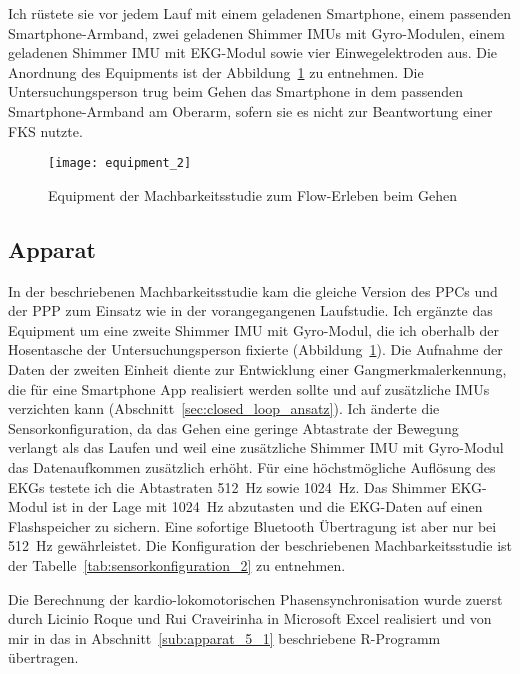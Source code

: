 Ich rüstete sie vor jedem Lauf mit einem geladenen Smartphone, einem passenden Smartphone-Armband, zwei geladenen Shimmer \acp{IMU} mit Gyro-Modulen, einem geladenen Shimmer \ac{IMU} mit \ac{EKG}-Modul sowie vier Einwegelektroden aus. Die Anordnung des Equipments ist der Abbildung~\ref{fig:equipment_2} zu entnehmen. Die Untersuchungsperson trug beim Gehen das Smartphone in dem passenden Smartphone-Armband am Oberarm, sofern sie es nicht zur Beantwortung einer \ac{FKS} nutzte. 
\begin{figure}
	[!htb] \centering 
	\texttt{[image: equipment\_2]} \caption[Equipment (Machbarkeitsstudie: Gehen)]{Equipment der Machbarkeitsstudie zum Flow-Erleben beim Gehen} \label{fig:equipment_2} 
\end{figure}

\subsection{Apparat} 

\label{sub:apparat_5_2}

In der beschriebenen Machbarkeitsstudie kam die gleiche Version des \ac{PPC}s und der \ac{PPP} zum Einsatz wie in der vorangegangenen Laufstudie. Ich ergänzte das Equipment um eine zweite Shimmer \ac{IMU} mit Gyro-Modul, die ich oberhalb der Hosentasche der Untersuchungsperson fixierte (Abbildung~\ref{fig:equipment_2}). Die Aufnahme der Daten der zweiten Einheit diente zur Entwicklung einer Gangmerkmalerkennung, die für eine Smartphone App realisiert werden sollte und auf zusätzliche \acp{IMU} verzichten kann (Abschnitt~\ref{sec:closed_loop_ansatz}). Ich änderte die Sensorkonfiguration, da das Gehen eine geringe Abtastrate der Bewegung verlangt als das Laufen und weil eine zusätzliche Shimmer \ac{IMU} mit Gyro-Modul das Datenaufkommen zusätzlich erhöht. Für eine höchstmögliche Auflösung des \ac{EKG}s testete ich die Abtastraten 512~Hz sowie 1024~Hz. Das Shimmer \ac{EKG}-Modul ist in der Lage mit 1024~Hz abzutasten und die \ac{EKG}-Daten auf einen Flashspeicher zu sichern. Eine sofortige Bluetooth Übertragung ist aber nur bei 512~Hz gewährleistet. Die Konfiguration der beschriebenen Machbarkeitsstudie ist der Tabelle~\ref{tab:sensorkonfiguration_2} zu entnehmen. 

Die Berechnung der kardio-lokomotorischen Phasensynchronisation wurde zuerst durch Licinio Roque und Rui Craveirinha in Microsoft Excel realisiert und von mir in das in Abschnitt~\ref{sub:apparat_5_1} beschriebene R-Programm übertragen. 

